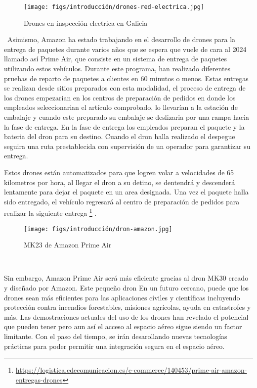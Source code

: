 \begin{figure} [H]
  \begin{center}
    \texttt{[image: figs/introducción/drones-red-electrica.jpg]}
  \end{center}
  \caption{Drones en inspección electrica en Galicia}
  \label{fig:Ingenuity}
\end{figure}\
Asimismo, Amazon ha estado trabajando en el desarrollo de drones para la entrega de paquetes durante varios años que se espera que vuele de cara al 2024 llamado así Prime Air\cite{AmazonPrimeAir}, 
que consiste en un sistema de entrega de paquetes utilizando estos vehículos. Durante este programa, han realizado diferentes pruebas de reparto de paquetes a clientes
en 60 minutos o menos. Estas entregas se realizan desde sitios preparados con esta modalidad, el proceso de entrega de los drones empezarian en los centros de preparación de pedidos en 
donde los empleados seleccionarian el artículo comprobado, lo llevarían a la estación de embalaje y cuando este preparado su embalaje se deslizaria por una rampa hacia la fase de
entrega. 
En la fase de entrega los empleados preparan el paquete y la bateria del dron para su destino. Cuando el dron halla realizado el despegue seguira una ruta prestablecida con supervisión
de un operador para garantizar su entrega. \newline

Estos drones están automatizados para que logren volar a velocidades de 65 kilometros por hora, al llegar el dron a su detino, se dentendrá y descenderá lentamente para dejar el 
paquete en un area designada. Una vez el paquete halla sido entregado, el vehículo regresará al centro de preparación de pedidos para realizar la siguiente entrega 
\footnote{\url{https://logistica.cdecomunicacion.es/e-commerce/140453/prime-air-amazon-entregas-drones}} . 

\begin{figure} [H]
  \begin{center}
    \texttt{[image: figs/introducción/dron-amazon.jpg]}
  \end{center}
  \caption{MK23 de Amazon Prime Air}
  \label{fig:Ingenuity}
\end{figure}\

Sin embargo, Amazon Prime Air será más eficiente gracias al dron MK30 creado y diseñado por Amazon. Este pequeño dron 
\newline
En un futuro cercano, puede que los drones sean más eficientes para las aplicaciones cíviles y científicas incluyendo protección contra incendios forestables, misiones agrícolas, 
ayuda en catastrofes y más. 
Las demostraciones actuales del uso de los drones han revelado el potencial que pueden tener pero aun así el acceso al espacio aéreo sigue siendo un factor limitante. Con el paso del 
tiempo, se irán desarollando nuevas tecnologías prácticas para poder permitir una integración segura en el espacio aéreo. 


